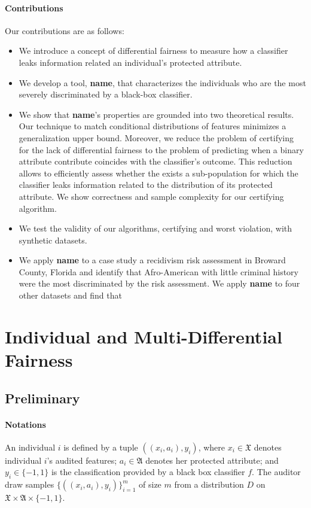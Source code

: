 \documentclass{article}
\begin{document}
 \paragraph{Contributions}
Our contributions are as follows:
\begin{itemize}
	\item We introduce a concept of differential fairness to measure how a classifier leaks information related an individual's protected attribute. 
	\item We develop a tool, \textbf{name}, that characterizes the individuals who are the most severely discriminated by a black-box classifier.
	\item We show that \textbf{name}'s properties are grounded into two theoretical results. Our technique to match conditional distributions of features minimizes a generalization upper bound. Moreover, we reduce the problem of certifying for the lack of differential fairness to the problem of predicting when a binary attribute contribute coincides with the classifier's outcome. This reduction allows to efficiently assess whether the exists a sub-population for which the classifier leaks information related to the distribution of its protected attribute. We show correctness and sample complexity for our certifying algorithm.
	\item We test the validity of our algorithms, certifying and worst violation, with synthetic datasets.
	\item We apply \textbf{name} to a case study a recidivism risk assessment in Broward County, Florida and identify that Afro-American with little criminal history were the most discriminated by the risk assessment. 
	\iem We apply \textbf{name} to four other datasets and find that 
\end{itemize}
 
 
  



\section{Individual and Multi-Differential Fairness}

\subsection{Preliminary}

\paragraph{Notations}
An individual $i$ is defined by a tuple $((x_{i}, a_{i}), y_{i})$, where $x_{i}\in \mathfrak{X}$ denotes individual $i$'s audited features; $a_{i}\in\mathfrak{A}$ denotes her protected attribute; and $y_{i}\in \{-1, 1\}$ is the classification provided by a black box classifier $f$. The auditor draw samples $
\{((x_{i}, a_{i}), y_{i})\}_{i=1}^{m}$ of size $m$ from a distribution $D$ on $\mathfrak{X} \times \mathfrak{A}\times \{-1, 1\}$. 
\end{document}
